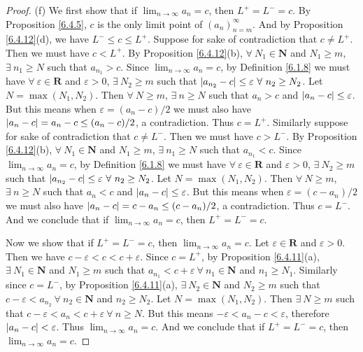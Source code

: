\begin{proof}{(f)}
We first show that if \(\lim_{n \to \infty} a_n = c\), then \(L^+ = L^- = c\).
By Proposition \ref{6.4.5}, \(c\) is the only limit point of \((a_n)_{n = m}^\infty\).
And by Proposition \ref{6.4.12}(d), we have \(L^- \leq c \leq L^+\).
Suppose for sake of contradiction that \(c \neq L^+\).
Then we must have \(c < L^+\).
By Proposition \ref{6.4.12}(b), \(\forall\ N_1 \in \mathbf{N}\) and \(N_1 \geq m\), \(\exists\ n_1 \geq N\) such that \(a_{n_1} > c\).
Since \(\lim_{n \to \infty} a_n = c\), by Definition \ref{6.1.8} we must have \(\forall\ \varepsilon \in \mathbf{R}\) and \(\varepsilon > 0\), \(\exists\ N_2 \geq m\) such that \(\abs*{a_{n_2} - c} \leq \varepsilon \ \forall\ n_2 \geq N_2\).
Let \(N = \max(N_1, N_2)\).
Then \(\forall\ N \geq m\), \(\exists\ n \geq N\) such that \(a_n > c\) and \(\abs*{a_n - c} \leq \varepsilon\).
But this means when \(\varepsilon = (a_n - c) / 2\) we must also have \(\abs*{a_n - c} = a_n - c \leq (a_n - c) / 2\), a contradiction.
Thus \(c = L^+\).
Similarly suppose for sake of contradiction that \(c \neq L^-\).
Then we must have \(c > L^-\).
By Proposition \ref{6.4.12}(b), \(\forall\ N_1 \in \mathbf{N}\) and \(N_1 \geq m\), \(\exists\ n_1 \geq N\) such that \(a_{n_1} < c\).
Since \(\lim_{n \to \infty} a_n = c\), by Definition \ref{6.1.8} we must have \(\forall\ \varepsilon \in \mathbf{R}\) and \(\varepsilon > 0\), \(\exists\ N_2 \geq m\) such that \(\abs*{a_{n_2} - c} \leq \varepsilon \ \forall\ n_2 \geq N_2\).
Let \(N = \max(N_1, N_2)\).
Then \(\forall\ N \geq m\), \(\exists\ n \geq N\) such that \(a_n < c\) and \(\abs*{a_n - c} \leq \varepsilon\).
But this means when \(\varepsilon = (c - a_n) / 2\) we must also have \(\abs*{a_n - c} = c - a_n \leq (c - a_n) / 2\), a contradiction.
Thus \(c = L^-\).
And we conclude that if \(\lim_{n \to \infty} a_n = c\), then \(L^+ = L^- = c\).

Now we show that if \(L^+ = L^- = c\), then \(\lim_{n \to \infty} a_n = c\).
Let \(\varepsilon \in \mathbf{R}\) and \(\varepsilon > 0\).
Then we have \(c - \varepsilon < c < c + \varepsilon\).
Since \(c = L^+\), by Proposition \ref{6.4.11}(a), \(\exists\ N_1 \in \mathbf{N}\) and \(N_1 \geq m\) such that \(a_{n_1} < c + \varepsilon \ \forall\ n_1 \in \mathbf{N}\) and \(n_1 \geq N_1\).
Similarly since \(c = L^-\), by Proposition \ref{6.4.11}(a), \(\exists\ N_2 \in \mathbf{N}\) and \(N_2 \geq m\) such that \(c - \varepsilon < a_{n_2} \ \forall\ n_2 \in \mathbf{N}\) and \(n_2 \geq N_2\).
Let \(N = \max(N_1, N_2)\).
Then \(\exists\ N \geq m\) such that \(c - \varepsilon < a_n < c + \varepsilon \ \forall\ n \geq N\).
But this means \(-\varepsilon < a_n - c < \varepsilon\), therefore \(\abs*{a_n - c} < \varepsilon\).
Thus \(\lim_{n \to \infty} a_n = c\).
And we conclude that if \(L^+ = L^- = c\), then \(\lim_{n \to \infty} a_n = c\).
\end{proof}

